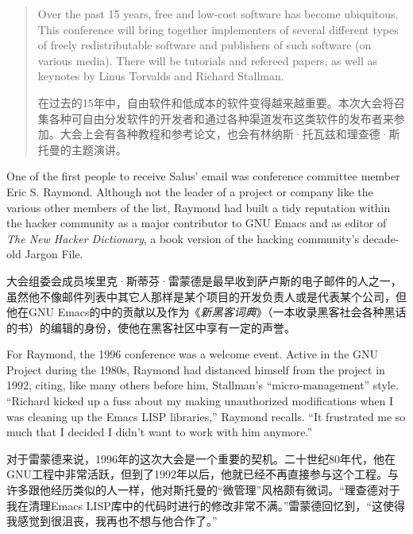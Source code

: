\begin{quote}
\ifdefined\eng
Over the past 15 years, free and low-cost software has become ubiquitous. This conference will bring together implementers of several different types of freely redistributable software and publishers of such software (on various media). There will be tutorials and refereed papers, as well as keynotes by Linus Torvalds and Richard Stallman.
\fi

\ifdefined\chs
在过去的15年中，自由软件和低成本的软件变得越来越重要。本次大会将召集各种可自由分发软件的开发者和通过各种渠道发布这类软件的发布者来参加。大会上会有各种教程和参考论文，也会有林纳斯·托瓦兹和理查德·斯托曼的主题演讲。
\fi
\end{quote}

\ifdefined\eng
One of the first people to receive Salus' email was conference committee member Eric S. Raymond. Although not the leader of a project or company like the various other members of the list, Raymond had built a tidy reputation within the hacker community as a major contributor to GNU Emacs and as editor of \textit{The New Hacker Dictionary}, a book version of the hacking community's decade-old Jargon File.
\fi

\ifdefined\chs
大会组委会成员埃里克·斯蒂芬·雷蒙德是最早收到萨卢斯的电子邮件的人之一，虽然他不像邮件列表中其它人那样是某个项目的开发负责人或是代表某个公司，但他在GNU Emacs的中的贡献以及作为《\textit{新黑客词典}》（一本收录黑客社会各种黑话的书）的编辑的身份，使他在黑客社区中享有一定的声誉。
\fi

\ifdefined\eng
For Raymond, the 1996 conference was a welcome event. Active in the GNU Project during the 1980s, Raymond had distanced himself from the project in 1992, citing, like many others before him, Stallman's ``micro-management'' style. ``Richard kicked up a fuss about my making unauthorized modifications when I was cleaning up the Emacs LISP libraries,'' Raymond recalls. ``It frustrated me so much that I decided I didn't want to work with him anymore.''
\fi

\ifdefined\chs
对于雷蒙德来说，1996年的这次大会是一个重要的契机。二十世纪80年代，他在GNU工程中非常活跃，但到了1992年以后，他就已经不再直接参与这个工程。与许多跟他经历类似的人一样，他对斯托曼的``微管理''风格颇有微词。``理查德对于我在清理Emacs LISP库中的代码时进行的修改非常不满。''雷蒙德回忆到，``这使得我感觉到很沮丧，我再也不想与他合作了。''
\fi

